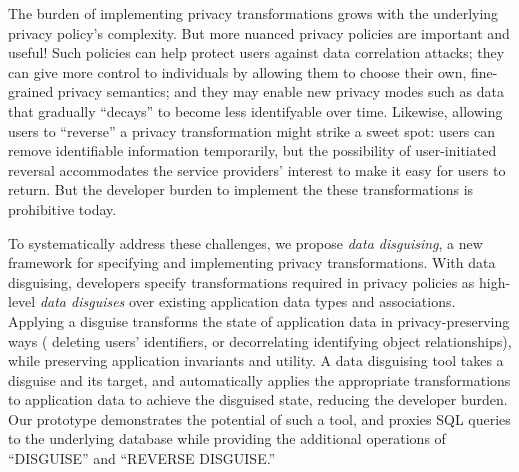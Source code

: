 %
The burden of implementing privacy transformations grows with the underlying privacy policy's
complexity.
%
But more nuanced privacy policies are important and useful!
%
Such policies can help protect users against data correlation attacks; they can give more
control to individuals by allowing them to choose their own, fine-grained privacy semantics; and
they may enable new privacy modes such as data that gradually ``decays'' to become less identifyable over time.
%
Likewise, allowing users to ``reverse'' a privacy transformation might strike a sweet spot: users
can remove identifiable information temporarily, but the possibility of user-initiated reversal
accommodates the service providers' interest to make it easy for users to return.
%
But the developer burden to implement the these transformations is prohibitive today.
%


%
To systematically address these challenges, we propose \emph{data disguising}, a new framework
for specifying and implementing privacy transformations.
%
With data disguising, developers specify transformations required in privacy policies as
high-level \emph{data disguises} over existing application data types and associations.
%
Applying a disguise transforms the state of application data in privacy-preserving ways (\eg
deleting users' identifiers, or decorrelating identifying object relationships), while preserving
application invariants and utility.
%
%
A data disguising tool takes a disguise and its target, and automatically applies the appropriate
transformations to application data to achieve the disguised state, reducing the developer burden.
Our prototype \sys demonstrates the potential of such a tool, and proxies SQL queries to the
underlying database while providing the additional operations of ``DISGUISE'' and ``REVERSE
DISGUISE.''
%

